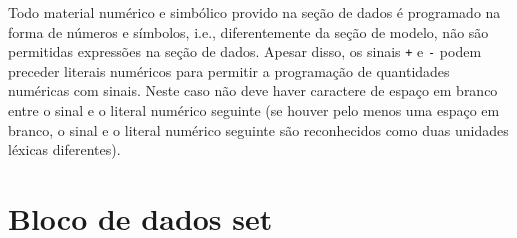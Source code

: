 \documentclass[11pt, brazil]{report}
\begin{document}
Todo material numérico e simbólico provido na seção de dados é programado
na forma de números e símbolos, i.e., diferentemente da seção de modelo,
não são permitidas expressões na seção de dados. Apesar disso, os sinais
{\tt+} e {\tt-} podem preceder literais numéricos para permitir a programação
de quantidades numéricas com sinais. Neste caso não deve haver caractere de
espaço em branco entre o sinal e o literal numérico seguinte (se houver
pelo menos uma espaço em branco, o sinal e o literal numérico seguinte são
reconhecidos como duas unidades léxicas diferentes).



%
%

\newpage

\section{Bloco de dados set}

\noindent
{}
\end{document}
